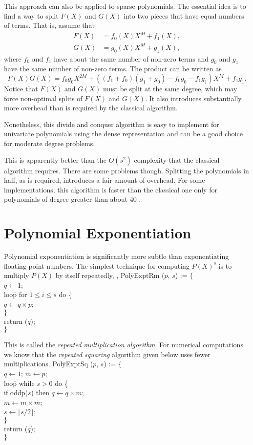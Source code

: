 This approach can also be applied to sparse polynomials.  The
essential idea is to find a way to split $F(X)$ and $G(X)$ into two
pieces that have equal numbers of terms.  That is, assume that
\[
\begin{aligned}
F(X)&= f_0(X) X^{M} + f_1(X),\\
G(X)&= g_0(X) X^{M} + g_1(X),
\end{aligned}
\]
where $f_0$ and $f_1$ have about the same number of non-zero terms and
$g_0$ and $g_1$ have the same number of non-zero terms.  The product
can be written as
\[
  F(X) G(X) = f_0 g_0 X^{2M} 
       + ((f_1 + f_0) (g_1 + g_0) - f_0 g_0 - f_1 g_1) X^{M}
       + f_1 g_1.
\]
Notice that $F(X)$ and $G(X)$ must be split at the same degree, which
may force non-optimal splits of  $F(X)$ and $G(X)$.  It also
introduces substantially more overhead than is required by the
classical algorithm.  

Nonetheless, this divide and conquer algorithm is easy to implement
for univariate polynomials using the dense representation and can be a
good choice for moderate degree problems.  

This is apparently better than the $O(s^2)$ complexity that the
classical algorithm requires.  There are some problems though.
Splitting the polynomials in half, as is required, introduces a fair
amount of overhead.  For some implementations, this algorithm is
faster than the classical one only for polynomials of degree greater
than about 40 \cite{Fateman1974-xv}.


\section{Polynomial Exponentiation}
\label{Poly:Expt:Sec}

Polynomial exponentiation is significantly more subtle than
exponentiating floating point numbers.  The simplest technique for
computing $P(X)^s$ is to multiply $P(X)$ by itself repeatedly, \ie,
\begindsacode
Pol\=yExptRm ($p$, $s$) := $\{$\\
\> $q \leftarrow 1$; \\
\> loo\=p for $1 \le i \le s$ do \{\\
\> \> $q \leftarrow q \times p$; \\
\>\> $\}$ \\
\> return ($q$); \\
\>$\}$
\enddsacode

\noindent
This is called the {\em repeated multiplication algorithm\/}.  For numerical
computations we know that the {\em repeated squaring} algorithm given
below uses fewer multiplications.
\begindsacode
Pol\=yExptSq ($p$, $s$) := $\{$\\
\> $q \leftarrow 1$;  $m \leftarrow p$; \\
\> loo\=p while $s > 0$ do \{\\
\> \> if oddp($s$) then $q \leftarrow q \times m$; \\
\> \> $m \leftarrow m \times m$; \\
\> \> $s \leftarrow \lfloor s/2 \rfloor$; \\
\>\> $\}$ \\
\> return ($q$); \\
\> $\}$
\enddsacode

